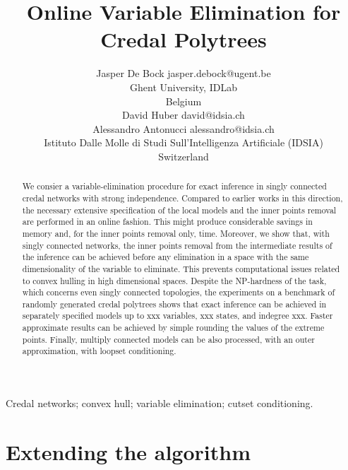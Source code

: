 \documentclass[twoside,11pt]{article}
\begin{document}
\title{Online Variable Elimination for Credal Polytrees}
\author{\name Jasper De Bock \email jasper.debock@ugent.be\\
\addr Ghent University, IDLab\\
Belgium\\
\AND
\name David Huber \email david@idsia.ch\\
\name Alessandro Antonucci \email alessandro@idsia.ch\\
\addr Istituto Dalle Molle di Studi Sull'Intelligenza Artificiale (IDSIA)\\
Switzerland}
\maketitle
\begin{abstract}%
We consier a variable-elimination procedure for exact inference in singly connected credal networks with strong independence. Compared to earlier works in this direction, the necessary extensive specification of the local models and the inner points removal are performed in an online fashion. This might produce considerable savings in memory and, for the inner points removal only, time. Moreover, we show that, with singly connected networks, the inner points removal from the intermediate results of the inference can be achieved before any elimination in a space with the same dimensionality of the variable to eliminate. This prevents computational issues related to convex hulling in high dimensional spaces. Despite the NP-hardness of the task, which concerns even singly connected topologies, the experiments on a benchmark of randomly generated credal polytrees shows that exact inference can be achieved in separately specified models up to xxx variables, xxx states, and indegree xxx. Faster approximate results can be achieved by simple rounding the values of the extreme points. Finally, multiply connected models can be also processed, with an outer approximation, with loopset conditioning.
\end{abstract}
\begin{keywords}
Credal networks; convex hull; variable elimination; cutset conditioning.
\end{keywords}





%
\section{Extending the algorithm}
\end{document}
